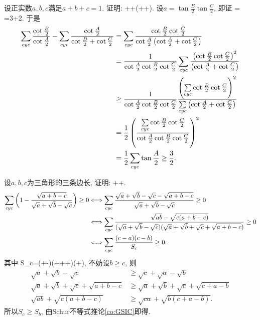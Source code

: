 \bq{}{}
设正实数$a,b,c$满足$a+b+c=1$. 证明: 
\bee
{}++\left(++\right).
\eee
\eq
\ba
设$a=\tan\frac{B}{2}\tan\frac{C}{2}$, 即证
\bee
\sumcyc{}=\sumcyc{}
=3+2\sumcyc{}\sumcyc{}.
\eee
于是
\begin{align*}
	\sum\limits_{cyc}\frac{\cot\frac{B}{2}}{\cot\frac{A}{2}}-\sum\limits_{cyc}\frac{\cot\frac{A}{2}}{\cot\frac{B}{2}+\cot\frac{C}{2}} & =\sum\limits_{cyc}\frac{\cot\frac{B}{2}\cot\frac{C}{2}}{\cot\frac{A}{2}\left(\cot\frac{A}{2}+\cot\frac{C}{2}\right)}\\
	& =\frac{1}{\cot\frac{A}{2}\cot\frac{B}{2}\cot\frac{C}{2}}\sum\limits_{cyc}\frac{\left(\cot\frac{B}{2}\cot\frac{C}{2}\right)^{2}}{\left(\cot\frac{A}{2}+\cot\frac{C}{2}\right)}\\
	& \ge\frac{1}{\cot\frac{A}{2}\cot\frac{B}{2}\cot\frac{C}{2}}\frac{\left(\sum\limits_{cyc}\cot\frac{B}{2}\cot\frac{C}{2}\right)^{2}}{\sum\limits_{cyc}\left(\cot\frac{A}{2}+\cot\frac{C}{2}\right)}\\
	& =\frac{1}{2}\left(\frac{\sum\limits_{cyc}\cot\frac{B}{2}\cot\frac{C}{2}}{\cot\frac{A}{2}\cot\frac{B}{2}\cot\frac{C}{2}}\right)^{2}\\
	& =\frac{1}{2}\sum\limits_{cyc}\tan\frac{A}{2}\ge\frac{3}{2}.
\end{align*}
\ea

设$a,b,c$为三角形的三条边长, 证明:
\bee
{}++.
\eee
\eq
\ba
\begin{align*}
\sum\limits_{cyc}\left(1-\frac{\sqrt{a+b-c}}{\sqrt{a}+\sqrt{b}-\sqrt{c}}\right)\ge0
  & \Longleftrightarrow\sum\limits_{cyc}\frac{\sqrt{a}+\sqrt{b}-\sqrt{c}-\sqrt{a+b-c}}{\sqrt{a}+\sqrt{b}-\sqrt{c}}\ge0\\
  & \Longleftrightarrow\sum\limits_{cyc}\frac{\sqrt{ab}-\sqrt{c(a+b-c)}}{(\sqrt{a}+\sqrt{b}-\sqrt{c})(\sqrt{a}+\sqrt{b}+\sqrt{c}+\sqrt{a+b-c})}\ge0\\
  & \Longleftrightarrow\sum\limits_{cyc}\frac{(c-a)(c-b)}{S_c}\ge0.
\end{align*}
其中
\bee
S_c=(+-)(+++)(+),
\eee
不妨设$b\ge c$, 则
\begin{align*}
\sqrt{a}+\sqrt{b}-\sqrt{c}&\ge\sqrt{c}+\sqrt{a}-\sqrt{b}\\
\sqrt{a}+\sqrt{b}+\sqrt{c}+\sqrt{a+b-c}&\ge\sqrt{a}+\sqrt{b}+\sqrt{c}+\sqrt{c+a-b}\\
\sqrt{ab}+\sqrt{c(a+b-c)}&\ge\sqrt{ca}+\sqrt{b(c+a-b)}.
\end{align*}
所以$S_c\ge S_b$, 由Schur不等式推论\ref{co:GSIC}即得.
\ea

